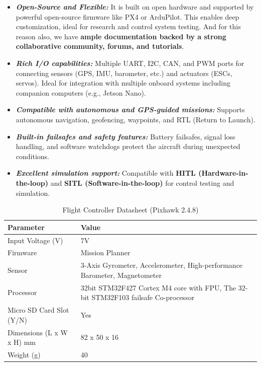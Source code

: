 \documentclass[12pt]{report}
\begin{document}
      \begin{itemize}
        \item \textbf{\textit{Open-Source and Flexible:}} It is built on open hardware and supported by powerful open-source firmware like PX4 or ArduPilot. This enables deep customization, ideal for research and control system testing. And for this reason also, we have \textbf{ample documentation backed by a strong collaborative community, forums, and tutorials}.
        \item \textbf{\textit{Rich I/O capabilities:}} Multiple UART, I2C, CAN, and PWM ports for connecting sensors (GPS, IMU, barometer, etc.) and actuators (ESCs, servos). Ideal for integration with multiple onboard systems including companion computers (e.g., Jetson Nano).
        \item \textbf{\textit{Compatible with autonomous and GPS-guided missions:}}  Supports autonomous navigation, geofencing, waypoints, and RTL (Return to Launch).
        \item \textbf{\textit{Built-in failsafes and safety features:}} Battery failsafes, signal loss handling, and software watchdogs protect the aircraft during unexpected conditions.
        \item \textbf{\textit{Excellent simulation support:}} Compatible with \textbf{HITL (Hardware-in-the-loop)} and \textbf{SITL (Software-in-the-loop)} for control testing and simulation.
      \end{itemize}
      \begin{table}[h!]
        \centering
        \caption{Flight Controller Datasheet (Pixhawk 2.4.8)}
        \begin{tabular}{|l|p{6cm}|}
          \hline
          \textbf{Parameter} & \textbf{Value} \\
          \hline
          Input Voltage (V)	& 7V \\
          Firmware	   &   Mission Planner \\
          Sensor	 &  {\small 3-Axis Gyrometer, Accelerometer, High-performance Barometer, Magnetometer} \\
          Processor	 &    {\small 32bit STM32F427 Cortex M4 core with FPU, The 32-bit STM32F103 failsafe Co-processor} \\
          Micro SD Card Slot (Y/N)	    &   Yes \\
          Dimensions {\small (L x W x H) mm}	   &   82 x 50 x 16 \\
          Weight (g)	 &    40 \\
          \hline
        \end{tabular}
      \end{table}
\end{document}
